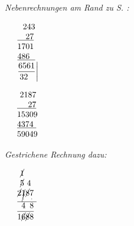 \pend
\vspace{2em}
\pstart
\noindent\lbrack\textit{Nebenrechnungen am Rand zu S. :}\rbrack{}
\pend
\pstart
\vspace*{1em}
\begin{minipage}[t]{0.2\textwidth}
\hspace*{-5mm}
$\begin{array}{ll}
&\ ~243\\
&\uline{\quad27}\\
&1701\\ 
&\uline{486~ \ }\\
&\displaystyle\frac{6561}{32\ ~} \bigg \vert \\
\end{array}$
\end{minipage}
\hspace*{17,3mm}
\begin{minipage}[t]{0.2\textwidth}
$\begin{array}{ll}
&\ 2187\\
&\uline{\quad~27}\\
&15309\\ 
&\uline{4374 \ }\\
&59049\\
\end{array}$
\end{minipage}
\pend
\vspace{1.5em}
\pstart
\noindent
\lbrack%
\textit{Gestrichene Rechnung dazu:}%
\rbrack
\hspace*{17,3mm}
\begin{minipage}[t]{0.2\textwidth}
\hspace*{-5mm}
$\begin{array}{ll}
&\ \cancel{1}\\
&\ \cancel{5}\ 4\\
&\cancel{2}\cancel{\underset{\cdot}1}\cancel{8}\underset{\cdot}7\\
&\overline{\ \, 4 \ \, 8 \ }\\
&\overline{1\cancel{6}\cancel{8}8}\\
\end{array}$
\end{minipage}
\pend
\count{}
\count{}
\count{}